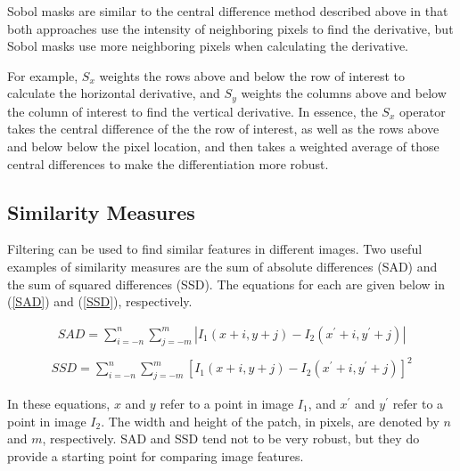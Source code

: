 \documentclass[twoside]{article}
\begin{document}
Sobol masks are similar to the central difference method described above in that both approaches use the intensity of neighboring pixels to find the derivative, but Sobol masks use more neighboring pixels when calculating the derivative.

For example, $S_x$ weights the rows above and below the row of interest to calculate the horizontal derivative, and $S_y$ weights the columns above and below the column of interest to find the vertical derivative. In essence, the $S_x$ operator takes the central difference of the the row of interest, as well as the rows above and below below the pixel location, and then takes a weighted average of those central differences to make the differentiation more robust.


\subsection{Similarity Measures}
Filtering can be used to find similar features in different images. Two useful examples of similarity measures are the sum of absolute differences (SAD) and the sum of squared differences (SSD). The equations for each are given below in (\ref{SAD}) and (\ref{SSD}), respectively.

\begin{equation}
  \label{SAD}
  \begin{aligned}
  	SAD = \sum_{i=-n}^n \sum_{j=-m}^m |I_1(x+i,y+j)-I_2(x^\prime+i,y^\prime+j)|\\
  \end{aligned}
\end{equation}
\begin{equation}
  \label{SSD}
  \begin{aligned}
	SSD = \sum_{i=-n}^n \sum_{j=-m}^m [I_1(x+i,y+j)-I_2(x^\prime+i,y^\prime+j)]^2
  \end{aligned}
\end{equation}

In these equations, $x$ and $y$ refer to a point in image $I_1$, and $x^\prime$ and $y^\prime$ refer to a point in image $I_2$.
The width and height of the patch, in pixels, are denoted by $n$ and $m$, respectively. SAD and SSD tend not to be very robust, but they do provide a starting point for comparing image features.


\end{document}
